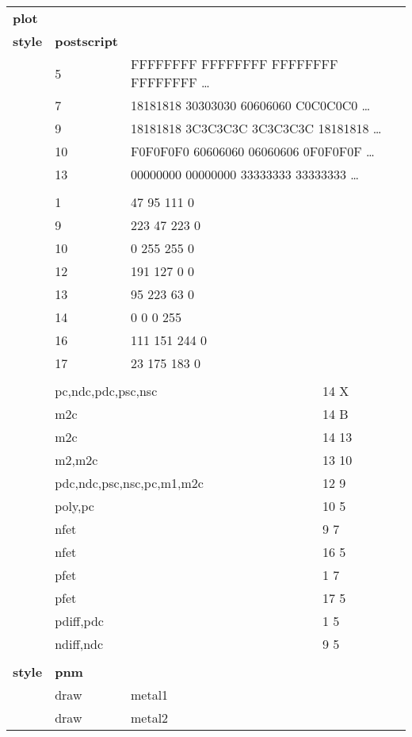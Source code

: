 \documentclass[letterpaper,twoside,12pt]{article}
\begin{document}
\begin{table}[p]
   \renewcommand{\baselinestretch}{0.9}
   \normalsize
   \begin{center}
      \begin{tabular}{|llll|} \hline
	{\bfseries plot} &&& \\
	{\bfseries style} & {\bfseries postscript} && \\

&  5  & \multicolumn{2}{l|}{FFFFFFFF FFFFFFFF FFFFFFFF FFFFFFFF \dots} \\
&  7  & \multicolumn{2}{l|}{18181818 30303030 60606060 C0C0C0C0 \dots} \\
&  9  & \multicolumn{2}{l|}{18181818 3C3C3C3C 3C3C3C3C 18181818 \dots} \\
& 10  & \multicolumn{2}{l|}{F0F0F0F0 60606060 06060606 0F0F0F0F \dots} \\
& 13  & \multicolumn{2}{l|}{00000000 00000000 33333333 33333333 \dots} \\
&&& \\
&  1 & 47 95 111 0 & \\
&  9 & 223 47 223 0 & \\
& 10 & 0 255 255 0 & \\
& 12 & 191 127 0 0 & \\
& 13 & 95 223 63 0 & \\
& 14 & 0 0 0 255 & \\
& 16 & 111 151 244 0 & \\
& 17 & 23 175 183 0 & \\
&&& \\
& \multicolumn{2}{l}{pc,ndc,pdc,psc,nsc} & 14 X \\
& m2c && 14 B \\
& m2c && 14 13 \\
& m2,m2c && 13 10 \\
& \multicolumn{2}{l}{pdc,ndc,psc,nsc,pc,m1,m2c} & 12 9 \\
& poly,pc && 10 5 \\
& nfet && 9 7 \\
& nfet && 16 5 \\
& pfet && 1 7 \\
& pfet && 17 5 \\
& pdiff,pdc && 1 5 \\
& ndiff,ndc && 9 5 \\
&&& \\
	{\bfseries style} & {\bfseries pnm} && \\
&  draw & metal1 & \\
&  draw & metal2 & \\

\end{tabular}
\end{center}
\end{table}
\end{document}
